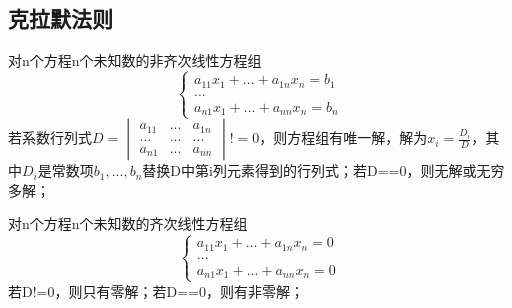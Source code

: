 \subsection{克拉默法则}

对n个方程n个未知数的非齐次线性方程组
\[\begin{cases}
a_{11}x_{1} +...+ a_{1n}x_{n} = b_1 \\ 
... \\ 
a_{n1}x_{1} +...+ a_{nn}x_{n} = b_n
\end{cases}\]
若系数行列式\(D = 
\begin{vmatrix}
a_{11} & ... & a_{1n} \\ 
... & ... & ... \\ 
a_{n1} & ... & a_{nn}
\end{vmatrix} != 0
\)，则方程组有唯一解，解为\(x_i = \frac{D_i}{D}\)，其中\(D_i\)是常数项\(b_1, ..., b_n\)替换D中第i列元素得到的行列式；若D==0，则无解或无穷多解；

对n个方程n个未知数的齐次线性方程组
\[\begin{cases}
a_{11}x_{1} +...+ a_{1n}x_{n} = 0 \\ 
... \\ 
a_{n1}x_{1} +...+ a_{nn}x_{n} = 0
\end{cases}\]
若D!=0，则只有零解；若D==0，则有非零解；


